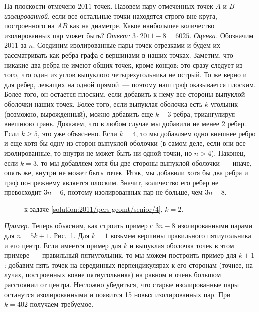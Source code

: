 \problem
На плоскости отмечено $2011$ точек.
Назовем пару отмеченных точек $A$ и $B$ \emph{изолированной}, если все остальные
точки находятся строго вне круга, построенного на $AB$ как на диаметре.
Какое наибольшее количество изолированных пар может быть?
\solution
\label{solution:2011/pers-geomt/senior/4}%
\emph{Ответ:}
$3 \cdot 2011 - 8 = 6025$.
\emph{Оценка.}
Обозначим $2011$ за $n$.
Соединим изолированные пары точек отрезками и будем их рассматривать как ребра
графа с вершинами в наших точках.
Заметим, что никакие два ребра не имеют общих точек, кроме концов:
это сразу следует из того, что один из углов выпуклого четырехугольника не
острый.
То же верно и для ребер, лежащих на одной прямой~--- поэтому наш граф
оказывается плоским.
Более того, он остается плоским, если добавить к нему все стороны выпуклой
оболочки наших точек.
Более того, если выпуклая оболочка есть $k$-угольник (возможно, вырожденный),
можно добавить еще $k - 3$ ребра, триангулируя внешнюю грань.
Докажем, что в любом случае мы добавили не менее 2 ребер.
Если $k \geq 5$, это уже объяснено.
Если $k = 4$, то мы добавляем одно внешнее ребро и еще хотя бы одну из сторон
выпуклой оболочки
(в самом деле, если они все изолированные, то внутри не может быть ни одной
точки, но $n > 4$).
Наконец, если $k = 3$, то мы добавляем хотя бы две стороны выпуклой
оболочки~--- иначе, опять же, внутри не может быть точек.
Итак, мы добавили хотя бы два ребра и граф по-прежнему является плоским.
Значит, количество его ребер не превосходит $3 n - 6$, поэтому изолированных
пар не больше, чем $3 n - 8$.
\\
\begin{figure}\centering
    \caption{к задаче \ref{solution:2011/pers-geomt/senior/4}, $k = 2$.}
    \label{fig:solution:2011/pers-geomt/senior/4}
\end{figure}%
\emph{Пример.}
Теперь объясним, как строить пример с $3 n - 8$ изолированными парами для
$n = 5 k + 1$.
Рис.~\ref{fig:solution:2011/pers-geomt/senior/4}.
Для $k = 1$ возьмем вершины правильного пятиугольника и его центр.
Если имеется пример для $k$ и выпуклая оболочка точек в этом примере~---
правильный пятиугольник, то мы можем построить пример для $k + 1$:
добавим пять точек на серединных перпендикулярах к его сторонам (точнее, на
лучах, построенных вовне пятиугольника) на равном и очень большом расстоянии от
центра.
Несложно убедиться, что старые изолированные пары останутся изолированными и
появится 15 новых изолированных пар.
При $k = 402$ получаем требуемое.
\endproblem

